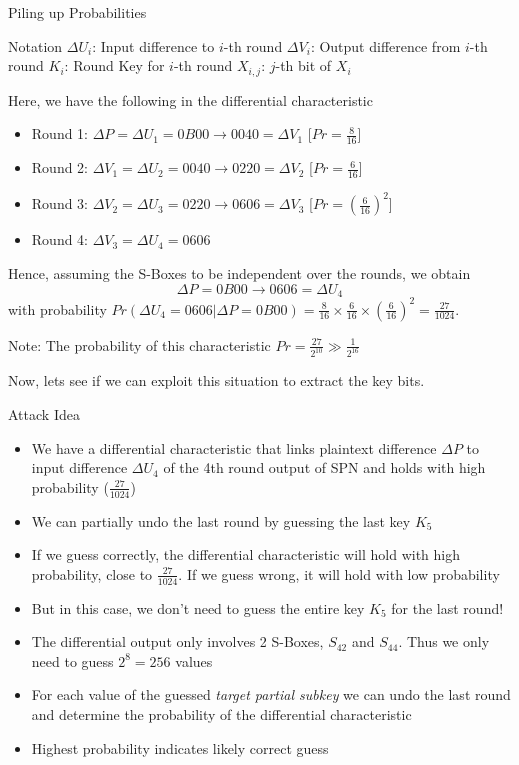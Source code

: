 \documentclass[9pt]{beamer}
\begin{document}
\begin{frame}
Piling up Probabilities

Notation
$\Delta U_i$: Input difference to $i$-th round
$\Delta V_i$: Output difference from $i$-th round
$K_i$: Round Key for $i$-th round
$X_{i,j}$: $j$-th bit of $X_i$

Here, we have the following in the differential characteristic
\begin{itemize}
\item{Round 1: $\Delta P = \Delta U_1 = 0B00 \rightarrow 0040 = \Delta V_1$ [$Pr = \frac{8}{16}$]}
\item{Round 2: $\Delta V_1 = \Delta U_2 = 0040 \rightarrow 0220 = \Delta V_2$ [$Pr = \frac{6}{16}$]}
\item{Round 3: $\Delta V_2 = \Delta U_3 = 0220 \rightarrow 0606 = \Delta V_3$ [$Pr = \left(\frac{6}{16}\right)^2$]}
\item{Round 4: $\Delta V_3 = \Delta U_4 = 0606$}
\end{itemize}

Hence, assuming the S-Boxes to be independent over the rounds, we obtain
\[ \Delta P = 0B00 \rightarrow 0606 = \Delta U_4 \]
with probability $Pr(\Delta U_4 = 0606 | \Delta P = 0B00) = \frac{8}{16} \times \frac{6}{16} \times \left(\frac{6}{16}\right)^2 = \frac{27}{1024}$.

Note: The probability of this characteristic $Pr = \frac{27}{2^{10}} \gg \frac{1}{2^{16}}$

Now, lets see if we can exploit this situation to extract the key bits.
\end{frame}

\begin{frame}
Attack Idea
\begin{itemize}
\item{We have a differential characteristic that links plaintext difference $\Delta P$ to input difference $\Delta U_4$ of the 4th round output of SPN and holds with high probability ($\frac{27}{1024}$)}
\item{We can partially undo the last round by guessing the last key $K_5$}
\item{If we guess correctly, the differential characteristic will hold with high probability, close to $\frac{27}{1024}$. If we guess wrong, it will hold with low probability}
\item{But in this case, we don't need to guess the entire key $K_5$ for the last round!}
\item{The differential output only involves 2 S-Boxes, $S_{42}$ and $S_{44}$. Thus we only need to guess $2^8 = 256$ values}
\item{For each value of the guessed \textit{target partial subkey} we can undo the last round and determine the probability of the differential characteristic}
\item{Highest probability indicates likely correct guess}
\end{itemize}

\end{frame}
\end{document}
